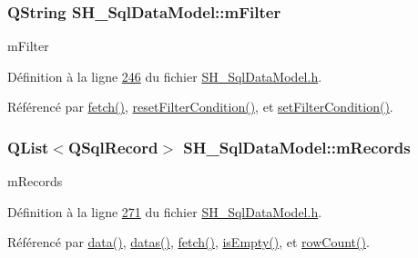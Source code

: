 \hypertarget{classSH__SqlDataModel_af83c15ae3ad1dc4617dd58f2a852a1e2}{
\subsubsection[{m\-Filter}]{\setlength{\rightskip}{0pt plus 5cm}Q\-String S\-H\-\_\-\-Sql\-Data\-Model\-::m\-Filter\hspace{0.3cm}{\ttfamily [private]}}}\label{classSH__SqlDataModel_af83c15ae3ad1dc4617dd58f2a852a1e2}


m\-Filter 



Définition à la ligne \hyperlink{SH__SqlDataModel_8h_source_l00246}{246} du fichier \hyperlink{SH__SqlDataModel_8h_source}{S\-H\-\_\-\-Sql\-Data\-Model.\-h}.



Référencé par \hyperlink{classSH__SqlDataModel_ab6c206088250a66ddc8cb8d33a38e421}{fetch()}, \hyperlink{classSH__SqlDataModel_a0bf147a87376fc3aa436562f94661679}{reset\-Filter\-Condition()}, et \hyperlink{classSH__SqlDataModel_a99c6317027a7c9f723215b53b69e0647}{set\-Filter\-Condition()}.

\hypertarget{classSH__SqlDataModel_aa58096989daac3cd3fdea5e6dd4f27ee}{
\subsubsection[{m\-Records}]{\setlength{\rightskip}{0pt plus 5cm}Q\-List$<$Q\-Sql\-Record$>$ S\-H\-\_\-\-Sql\-Data\-Model\-::m\-Records\hspace{0.3cm}{\ttfamily [private]}}}\label{classSH__SqlDataModel_aa58096989daac3cd3fdea5e6dd4f27ee}


m\-Records 



Définition à la ligne \hyperlink{SH__SqlDataModel_8h_source_l00271}{271} du fichier \hyperlink{SH__SqlDataModel_8h_source}{S\-H\-\_\-\-Sql\-Data\-Model.\-h}.



Référencé par \hyperlink{classSH__SqlDataModel_aa4664329d52c2d2cba2bacc42fa1a564}{data()}, \hyperlink{classSH__SqlDataModel_a24db284b370930b57e2261a7a72e2da8}{datas()}, \hyperlink{classSH__SqlDataModel_ab6c206088250a66ddc8cb8d33a38e421}{fetch()}, \hyperlink{classSH__SqlDataModel_ad85bfde0f7ffb06172eb5543e26d1331}{is\-Empty()}, et \hyperlink{classSH__SqlDataModel_a48d361600552aa4f80af693a68fc41dd}{row\-Count()}.

